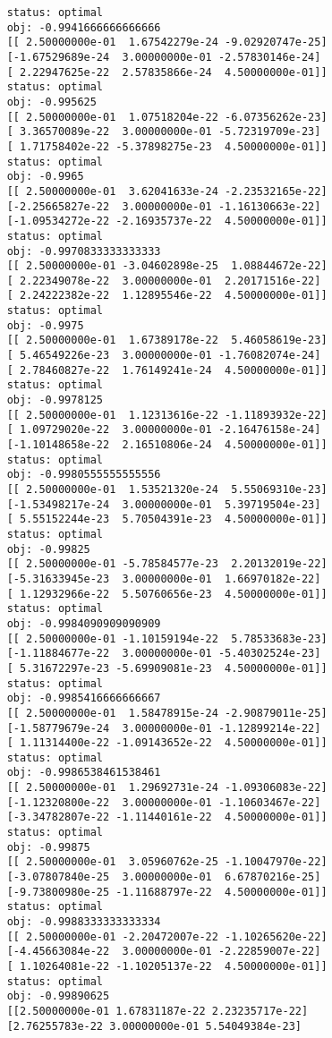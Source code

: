\begin{lstlisting}
	status: optimal
	obj: -0.9941666666666666
	[[ 2.50000000e-01  1.67542279e-24 -9.02920747e-25]
	[-1.67529689e-24  3.00000000e-01 -2.57830146e-24]
	[ 2.22947625e-22  2.57835866e-24  4.50000000e-01]]
	status: optimal
	obj: -0.995625
	[[ 2.50000000e-01  1.07518204e-22 -6.07356262e-23]
	[ 3.36570089e-22  3.00000000e-01 -5.72319709e-23]
	[ 1.71758402e-22 -5.37898275e-23  4.50000000e-01]]
	status: optimal
	obj: -0.9965
	[[ 2.50000000e-01  3.62041633e-24 -2.23532165e-22]
	[-2.25665827e-22  3.00000000e-01 -1.16130663e-22]
	[-1.09534272e-22 -2.16935737e-22  4.50000000e-01]]
	status: optimal
	obj: -0.9970833333333333
	[[ 2.50000000e-01 -3.04602898e-25  1.08844672e-22]
	[ 2.22349078e-22  3.00000000e-01  2.20171516e-22]
	[ 2.24222382e-22  1.12895546e-22  4.50000000e-01]]
	status: optimal
	obj: -0.9975
	[[ 2.50000000e-01  1.67389178e-22  5.46058619e-23]
	[ 5.46549226e-23  3.00000000e-01 -1.76082074e-24]
	[ 2.78460827e-22  1.76149241e-24  4.50000000e-01]]
	status: optimal
	obj: -0.9978125
	[[ 2.50000000e-01  1.12313616e-22 -1.11893932e-22]
	[ 1.09729020e-22  3.00000000e-01 -2.16476158e-24]
	[-1.10148658e-22  2.16510806e-24  4.50000000e-01]]
	status: optimal
	obj: -0.9980555555555556
	[[ 2.50000000e-01  1.53521320e-24  5.55069310e-23]
	[-1.53498217e-24  3.00000000e-01  5.39719504e-23]
	[ 5.55152244e-23  5.70504391e-23  4.50000000e-01]]
	status: optimal
	obj: -0.99825
	[[ 2.50000000e-01 -5.78584577e-23  2.20132019e-22]
	[-5.31633945e-23  3.00000000e-01  1.66970182e-22]
	[ 1.12932966e-22  5.50760656e-23  4.50000000e-01]]
	status: optimal
	obj: -0.9984090909090909
	[[ 2.50000000e-01 -1.10159194e-22  5.78533683e-23]
	[-1.11884677e-22  3.00000000e-01 -5.40302524e-23]
	[ 5.31672297e-23 -5.69909081e-23  4.50000000e-01]]
	status: optimal
	obj: -0.9985416666666667
	[[ 2.50000000e-01  1.58478915e-24 -2.90879011e-25]
	[-1.58779679e-24  3.00000000e-01 -1.12899214e-22]
	[ 1.11314400e-22 -1.09143652e-22  4.50000000e-01]]
	status: optimal
	obj: -0.9986538461538461
	[[ 2.50000000e-01  1.29692731e-24 -1.09306083e-22]
	[-1.12320800e-22  3.00000000e-01 -1.10603467e-22]
	[-3.34782807e-22 -1.11440161e-22  4.50000000e-01]]
	status: optimal
	obj: -0.99875
	[[ 2.50000000e-01  3.05960762e-25 -1.10047970e-22]
	[-3.07807840e-25  3.00000000e-01  6.67870216e-25]
	[-9.73800980e-25 -1.11688797e-22  4.50000000e-01]]
	status: optimal
	obj: -0.9988333333333334
	[[ 2.50000000e-01 -2.20472007e-22 -1.10265620e-22]
	[-4.45663084e-22  3.00000000e-01 -2.22859007e-22]
	[ 1.10264081e-22 -1.10205137e-22  4.50000000e-01]]
	status: optimal
	obj: -0.99890625
	[[2.50000000e-01 1.67831187e-22 2.23235717e-22]
	[2.76255783e-22 3.00000000e-01 5.54049384e-23]

\end{lstlisting}
